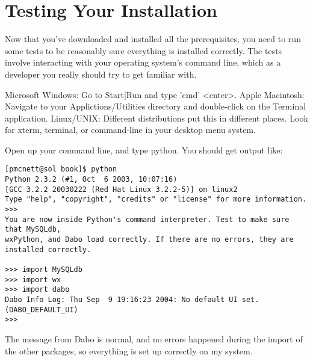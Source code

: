 \section{Testing Your Installation}

Now that you've downloaded and installed all the prerequisites, you need to run some tests to be reasonably sure everything is installed correctly. The tests involve interacting with your operating system's command line, which as a developer you really should try to get familiar with.

Microsoft Windows: Go to Start|Run and type 'cmd' <enter>.
Apple Macintosh: Navigate to your Applictions/Utilities directory and double-click on the Terminal application.
Linux/UNIX: Different distributions put this in different places. Look for xterm, terminal, or command-line in your desktop menu system.
	
Open up your command line, and type python. You should get output like:	%
\begin{verbatim}
[pmcnett@sol book]$ python
Python 2.3.2 (#1, Oct  6 2003, 10:07:16)
[GCC 3.2.2 20030222 (Red Hat Linux 3.2.2-5)] on linux2
Type "help", "copyright", "credits" or "license" for more information.
>>>
You are now inside Python's command interpreter. Test to make sure that MySQLdb,
wxPython, and Dabo load correctly. If there are no errors, they are installed correctly.

>>> import MySQLdb
>>> import wx
>>> import dabo
Dabo Info Log: Thu Sep  9 19:16:23 2004: No default UI set. (DABO_DEFAULT_UI)
>>>
\end{verbatim}
The message from Dabo is normal, and no errors happened during the import of the other packages, so everything is set up correctly on my system. 
